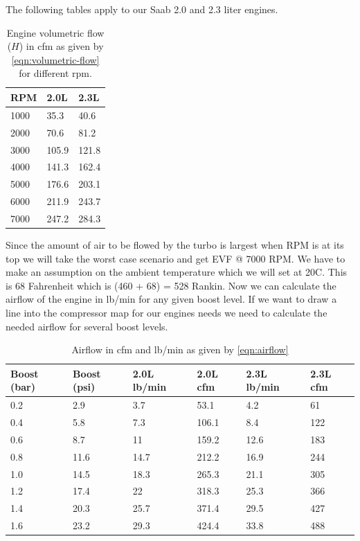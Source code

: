 \documentclass[11pt,a4paper]{book}
\begin{document}
The following tables apply to our Saab 2.0 and 2.3 liter engines.
\begin{table}
    \centering
    \begin{tabular}{lll}
        RPM & 2.0L & 2.3L \\
        \midrule
        1000 & 35.3 &40.6 \\
        2000 & 70.6 &81.2  \\
        3000 & 105.9 &121.8 \\
        4000 & 141.3 &162.4 \\
        5000 & 176.6 &203.1 \\
        6000 & 211.9 &243.7 \\
        7000 & 247.2 &284.3
    \end{tabular}
    \caption{Engine volumetric flow ($H$) in cfm as given by \cref{eqn:volumetric-flow}
    for different rpm.}
    \label{tab:volumetric-flow-rpm}
\end{table}
Since the amount of air to be flowed by the turbo is largest when RPM is at its
top we will take the worst case scenario and get EVF @ 7000 RPM. We have to make
an assumption on the ambient temperature which we will set at 20C. This is 68
Fahrenheit which is (460 + 68) = 528 Rankin. Now we can calculate the airflow of
the engine in lb/min for any given boost level. If we want to draw a line into
the compressor map for our engines needs we need to calculate the needed airflow
for several boost levels.

\begin{table}
    \centering
    \begin{tabular}{llllll}
        Boost (bar) & Boost (psi) & 2.0L lb/min & 2.0L cfm & 2.3L lb/min & 2.3L
        cfm \\
        \midrule
        0.2 & 2.9 &3.7& 53.1& 4.2& 61 \\
        0.4 & 5.8 &7.3 &106.1& 8.4& 122 \\
        0.6 & 8.7 &11& 159.2 &12.6 &183 \\
        0.8 & 11.6& 14.7& 212.2 &16.9 &244 \\
        1.0 & 14.5& 18.3& 265.3 &21.1 &305 \\
        1.2 & 17.4& 22& 318.3 &25.3 &366 \\
        1.4 & 20.3& 25.7 &371.4 &29.5 &427 \\
        1.6 & 23.2& 29.3 &424.4 &33.8 & 488
    \end{tabular}
    \caption{Airflow in cfm and lb/min as given by \cref{eqn:airflow}}
    \label{tab:airflow-rpm}
\end{table}
\end{document}
